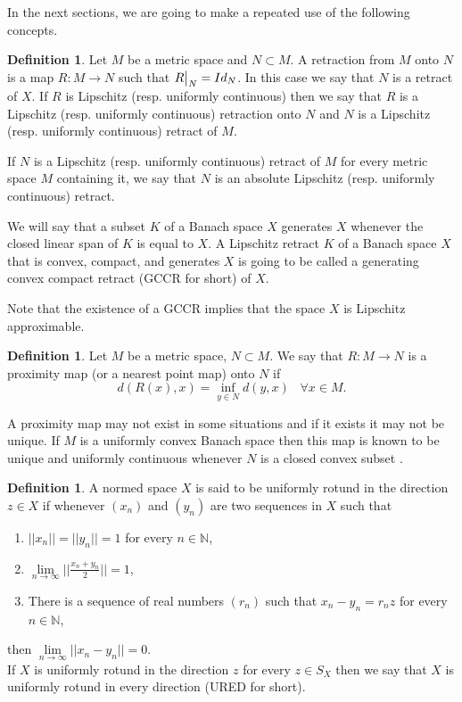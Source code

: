\documentclass[11pt]{amsart}
\newcommand{\N}{\mathbb{N}}
\newcommand\restr[2]{{%
  \left.\kern-\nulldelimiterspace %
  #1 %
  \vphantom{\big|} %
  \right|_{#2} %
  }}
\newcommand{\<}{\langle}
\renewcommand{\>}{\rangle}
\theoremstyle{definition}
\newtheorem{definition}[theorem]{Definition}
\theoremstyle{remark}
\numberwithin{equation}{section}
\begin{document}
In the next sections, we are going to make a repeated use of the following concepts.

\begin{definition}
Let $M$ be a metric space and $N\subset M$. A retraction from $M$ onto $N$ is a map $R:M\rightarrow N$ such that $\restr{R}{N}=Id_N$.
 In this case we say that $N$ is a retract of $X$. If $R$  is Lipschitz (resp. uniformly continuous) then we say that $R$ is a Lipschitz (resp. uniformly continuous) retraction onto $N$ and $N$ is a Lipschitz (resp. uniformly continuous) retract of $M$.

If $N$ is a Lipschitz (resp. uniformly continuous) retract of $M$ for every metric space $M$ containing it, we say that $N$ is an absolute Lipschitz (resp. uniformly continuous) retract.
\end{definition}

We will say that a subset $K$ of a Banach space $X$ generates $X$ whenever the closed linear span of $K$ is equal to $X$. A Lipschitz retract $K$ of a Banach space $X$ that is convex, compact, and generates $X$ is going to be called a generating convex compact retract (GCCR for short) of $X$.

Note that the existence of a GCCR implies that the space $X$ is Lipschitz approximable.

\begin{definition}
Let $M$ be a metric space,  $N\subset M$. We say that $R:M\rightarrow N$  is a proximity map (or a nearest point map) onto $N$ if
$$d(R(x),x)=\inf\limits_{y\in N}d(y,x)\;\;\;\forall x\in M.$$
\end{definition}

A proximity map may not exist in some situations and if it exists it may not be unique. If $M$ is a uniformly convex Banach space then this map is known to be unique and uniformly continuous whenever $N$ is a closed convex subset \cite{Bjo79}.

\begin{definition}
A normed space $X$ is said to be uniformly rotund in the direction $z\in X$ if whenever $(x_n)$ and $(y_n)$ are two sequences in $X$ such that
\begin{enumerate}
\item $||x_n||=||y_n||=1$ for every $n\in\N$,
\item $\lim\limits_{n\to\infty}\big|\big| \frac{x_n+y_n}{2} \big|\big|=1$,
\item There is a sequence of real numbers $(r_n)$ such that $x_n-y_n=r_nz$ for every $n\in\N$,
\end{enumerate}
then $\lim\limits_{n\to\infty}||x_n-y_n||=0$.\\
If $X$ is uniformly rotund in the direction $z$ for every $z\in S_X$ then we say that $X$ is uniformly rotund in every direction (URED for short).
\end{definition}
\end{document}
